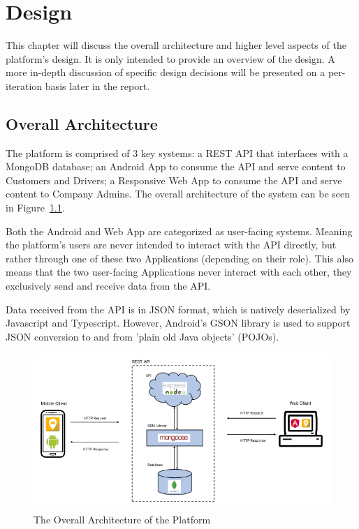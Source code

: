 \chapter{Design}
This chapter will discuss the overall architecture and higher level aspects of the platform's design. It is only intended to provide an overview of the design. A more in-depth discussion of specific design decisions will be presented on a per-iteration basis later in the report.

\section{Overall Architecture}
The platform is comprised of 3 key systems: a REST API that interfaces with a MongoDB database; an Android App to consume the API and serve content to Customers and Drivers; a Responsive Web App to consume the API and serve content to Company Admins. The overall architecture of the system can be seen in Figure~\ref{fig:overall_architecture}.

Both the Android and Web App are categorized as user-facing systems. Meaning the platform's users are never intended to interact with the API directly, but rather through one of these two Applications (depending on their role). This also means that the two user-facing  Applications never interact with each other, they exclusively send and receive data from the API.

Data received from the API is in JSON format, which is natively deserialized by Javascript and Typescript. However, Android's GSON library is used to support JSON conversion to and from 'plain old Java objects' (POJOs).

\newpage

\begin{figure}[!htb]
	\centering
	\includegraphics[width=0.75\linewidth]{Resources/img/overall_architecture.png}
	\caption{The Overall Architecture of the Platform}
	\label{fig:overall_architecture}
\end{figure}

